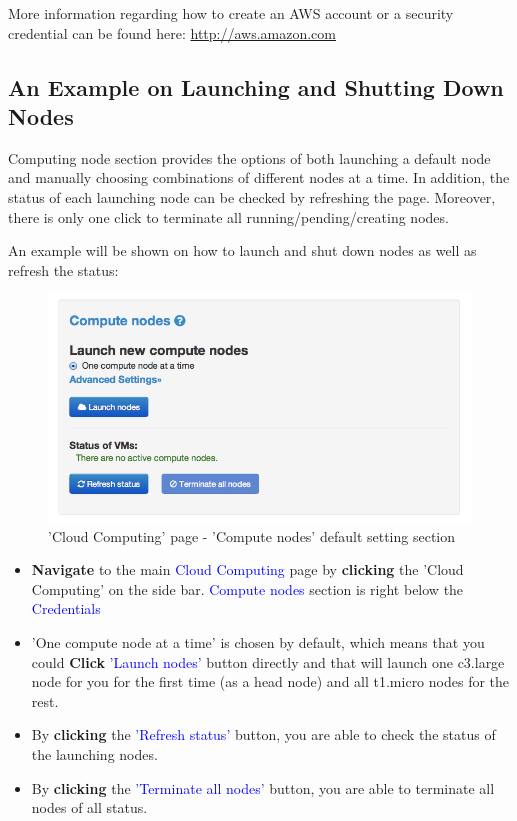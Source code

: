 More information regarding how to create an AWS account or a security credential can be found here: \url{http://aws.amazon.com}

\subsection{An Example on Launching and Shutting Down Nodes}
Computing node section provides the options of both launching a default node and manually choosing combinations of different nodes at a time. In addition, the status of each launching node can be checked by refreshing the page. Moreover, there is only one click to terminate all running/pending/creating nodes.

An example will be shown on how to launch and shut down nodes as well as refresh the status:

\begin{figure}[!ht]
\centering
\includegraphics[scale=0.45]{T6/T6_fig_computenode1.png}
\caption{'Cloud Computing' page - 'Compute nodes' default setting section}
\label{fig:2}
\end{figure}

\begin{itemize}
\item \textbf{Navigate} to the main \textcolor{blue}{Cloud Computing} page by \textbf{clicking} the 'Cloud Computing' on the side bar. \textcolor{blue}{Compute nodes} section is right below the \textcolor{blue}{Credentials}
\item 'One compute node at a time' is chosen by default, which means that you could \textbf{Click} \textcolor{blue}{'Launch nodes'} button directly and that will launch one c3.large node for you for the first time (as a head node) and all t1.micro nodes for the rest.
\item By \textbf{clicking} the \textcolor{blue}{'Refresh status'} button, you are able to check the status of the launching nodes.
\item By \textbf{clicking} the \textcolor{blue}{'Terminate all nodes'} button, you are able to terminate all nodes of all status. 

\end{itemize}

